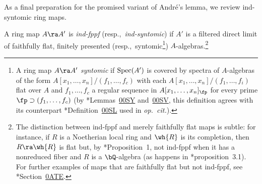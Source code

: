 As a final preparation for the promised variant of Andr\'{e}'s lemma, we review ind-syntomic ring maps.


 \label{ind-fppf-maps}
A ring map $A \ra A'$ is \emph{ind-fppf} (resp.,~\emph{ind-syntomic}) if $A'$ is a filtered direct limit of faithfully flat, finitely presented (resp.,~syntomic\footnote{%
A ring map $A \ra A'$ \emph{syntomic} if $\operatorname{Spec}(A')$ is covered by spectra of $A$-algebras of the form $A[x_1, \dotsc, x_n]/(f_1, \dotsc, f_c)$ with each $A[x_1, \dotsc, x_n]/(f_1, \dotsc, f_i)$ flat over $A$ and $f_1, \dotsc, f_c$ a regular sequence in $A[x_1, \dotsc, x_n]_\fp$ for every prime $\fp \supset (f_1, \dotsc, f_c)$ (by \cite{SP}*{Lemmas~\href{https://stacks.math.columbia.edu/tag/00SY}{00SY} and~\href{https://stacks.math.columbia.edu/tag/00SV}{00SV}}, this definition agrees with its counterpart \cite{SP}*{Definition~\href{https://stacks.math.columbia.edu/tag/00SL}{00SL}} used in \emph{op.~cit.}). %
}) $A$-algebras.\footnote{The distinction between ind-fppf and merely faithfully flat maps is subtle: for instance, if $R$ is a Noetherian local ring and $\wh{R}$ is its completion, then $R \ra \wh{R}$ is flat but, by \cite{Gab96}*{Proposition~1}, not ind-fppf when it has a nonreduced fiber and $R$ is a $\bQ$-algebra (as happens %
in \cite{FR70}*{proposition~3.1}). For further examples of maps that are faithfully flat but not ind-fppf, see \cite{SP}*{Section~\href{https://stacks.math.columbia.edu/tag/0ATE}{0ATE}}.}
